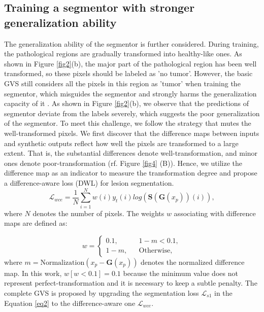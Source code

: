 \documentclass[journal,twoside,web]{ieeecolor}
\begin{document}
\subsection{Training a segmentor with stronger generalization ability}
\label{subsection:segmentor}
The generalization ability of the segmentor is further considered. During training, the pathological regions are gradually transformed into healthy-like ones. As shown in Figure \ref{fig2}(b), the major part of the pathological region has been well transformed, so these pixels should be labeled as 'no tumor'. However, the basic GVS still considers all the pixels in this region as 'tumor' when training the segmentor, which misguides the segmentor and strongly harms the generalization capacity of it \cite{zhang2016understanding}. 
As shown in Figure \ref{fig2}(b),  we observe that the predictions of segmentor deviate from the labels severely, which suggests the poor generalization of the segmentor.  To meet this challenge, we follow the strategy that mutes the well-transformed pixels. We first discover that the difference maps between inputs and synthetic outputs reflect how well the pixels are transformed to a large extent. That is, the substantial differences denote well-transformation, and minor ones denote poor-transformation (rf. Figure \ref{fig4} (B)). Hence, we utilize the difference map as an indicator to measure the transformation degree and propose a difference-aware loss (DWL) for lesion segmentation. 
\begin{equation}
	\mathcal{L}_{wce} = \frac{1}{N}\sum_{i=1}^{N}w(i)y_{t}(i)log(\mathbf{S}(\mathbf{G}(x_p))(i)),
\end{equation} 
where $N$ denotes the number of pixels.  The weights $w$ associating with difference maps are defined as:

\begin{equation}
	w =  \left\{
	\begin{array}{rcl}
		0.1,       &      & 1 - m< 0.1,\\
		1 - m,       &      & \text{Otherwise},
	\end{array} \right.
\end{equation} 
where $m = \text{Normalization}(x_p - \mathbf{G}(x_p))$ denotes the normalized difference map. 
In this work, $w[w < 0.1] = 0.1$ because the minimum value does not represent perfect-transformation and it is necessary to keep a subtle penalty. The complete GVS is proposed by upgrading the segmentation loss $\mathcal{L}_{s1}$ in the Equation \ref{eq2} to the difference-aware one $\mathcal{L}_{wce}$. 
\end{document}

